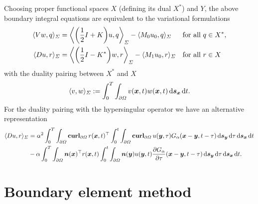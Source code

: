 \documentclass[a4paper,11pt]{article}
\begin{document}
Choosing proper functional spaces $X$ (defining its dual $X^\ast$) and $Y$, the above boundary integral equations are equivalent to the variational formulations
\begin{align}
  \label{eq:v_form}
  \langle Vw, q \rangle_\Sigma &= \bigg\langle \bigg( \frac{1}{2}I + K \bigg) u, q \bigg\rangle_\Sigma - \langle M_0 u_0, q \rangle_\Sigma &&\text{for all } q \in X^\ast,\\
  \notag
  \langle Du, r \rangle_\Sigma &= \bigg\langle \bigg( \frac{1}{2}I - K^\ast \bigg) w, r \bigg\rangle_\Sigma - \langle M_1 u_0, r \rangle_\Sigma &&\text{for all } r \in X
\end{align}
with the duality pairing between $X^\ast$ and $X$
\begin{equation*}
  \langle v, w \rangle_\Sigma := \int_0^T \int_{\partial\Omega} v({{\bm{x}}},t) w({{\bm{x}}},t) \,{\mathrm{d}}{{\bm{s}}}_{{\bm{x}}} \,{\mathrm{d}} t.
\end{equation*}
For the duality pairing with the hypersingular operator we have an alternative representation
\begin{equation}
\label{eq:D_bil}
\begin{aligned}
  \langle Du, r \rangle_\Sigma &= \alpha^2 \int_0^T \int_{\partial\Omega} \operatorname{\mathbf{curl}}_{\partial\Omega} r({{\bm{x}}},t)^\top \int_0^t \int_{\partial\Omega} \operatorname{\mathbf{curl}}_{\partial\Omega} u({{\bm{y}}},\tau) G_\alpha({{\bm{x}}}-{{\bm{y}}},t-\tau) \,{\mathrm{d}}{{\bm{s}}}_{{\bm{y}}} \,{\mathrm{d}}\tau \,{\mathrm{d}}{{\bm{s}}}_{{\bm{x}}} \,{\mathrm{d}} t \\
  &- \alpha \int_0^T \int_{\partial\Omega} {{\bm{n}}}({{\bm{x}}})^\top r({{\bm{x}}},t) \int_0^t \int_{\partial\Omega} {{\bm{n}}}({{\bm{y}}}) u({{\bm{y}}},t) \frac{\partial G_\alpha}{\partial \tau}({{\bm{x}}}-{{\bm{y}}},t-\tau) \,{\mathrm{d}}{{\bm{s}}}_{{\bm{y}}} \,{\mathrm{d}}\tau \,{\mathrm{d}}{{\bm{s}}}_{{\bm{x}}} \,{\mathrm{d}} t.
\end{aligned}
\end{equation}

\section{Boundary element method}
\end{document}
